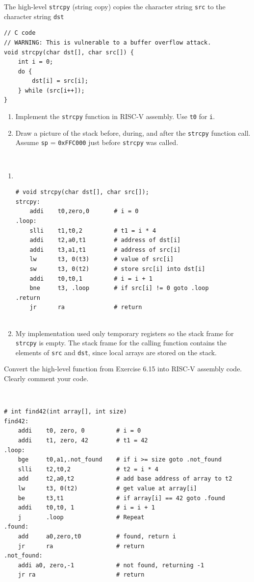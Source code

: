 \documentclass[12pt]{article}
\newenvironment{ex}[2][Exercise]{\begin{trivlist}
		\item[\hskip \labelsep {\bfseries #1}\hskip \labelsep {\bfseries #2.}]}{\end{trivlist}}
\newenvironment{sol}[1][Solution]{\begin{trivlist}
		\item[\hskip \labelsep {\bfseries #1:}]}{\end{trivlist}}
\begin{document}
\begin{ex}{6.16}
	The high-level \texttt{strcpy}  (string copy) copies the character
	string \texttt{src} to the character string \texttt{dst}
	\begin{lstlisting}
// C code
// WARNING: This is vulnerable to a buffer overflow attack.
void strcpy(char dst[], char src[]) {
	int i = 0;
	do {
		dst[i] = src[i];
	} while (src[i++]);
}
	\end{lstlisting}
	\begin{enumerate}[label=(\alph*)]
		\item Implement the \texttt{strcpy} function in RISC-V assembly.
		Use \texttt{t0} for \texttt{i}.
		\item Draw a picture of the stack before, during, and after the
		\texttt{strcpy} function call. Assume \texttt{sp} = \texttt{0xFFC000}
		just before \texttt{strcpy} was called.
	\end{enumerate}
\end{ex}

\begin{sol}
	\
	\begin{enumerate}[label=(\alph*)]
		\item 
		\
		\begin{lstlisting}[language={}]
	# void strcpy(char dst[], char src[]);
strcpy:
	addi	t0,zero,0		# i = 0
.loop:
	slli	t1,t0,2			# t1 = i * 4
	addi	t2,a0,t1		# address of dst[i]
	addi	t3,a1,t1		# address of src[i]
	lw		t3, 0(t3)		# value of src[i]
	sw		t3, 0(t2)		# store src[i] into dst[i]
	addi	t0,t0,1			# i = i + 1
	bne		t3, .loop		# if src[i] != 0 goto .loop
.return
	jr		ra				# return
	
		\end{lstlisting}
	\item My implementation used only temporary registers so the stack
	frame for \texttt{strcpy} is empty. The stack frame for the calling
	function contains the elements of \texttt{src} and \texttt{dst},
	since local arrays are stored on the stack.
	\end{enumerate}
\end{sol}

\begin{ex}{6.17}
	Convert the high-level function from Exercise 6.15 into RISC-V assembly
	code. Clearly comment your code.
\end{ex}

\begin{sol}
	\
	\begin{lstlisting}[language={}]
	# int find42(int array[], int size)
find42:
	addi	t0, zero, 0			# i = 0
	addi	t1, zero, 42		# t1 = 42
.loop:
	bge		t0,a1,.not_found	# if i >= size goto .not_found
	slli	t2,t0,2				# t2 = i * 4
	add		t2,a0,t2			# add base address of array to t2
	lw		t3, 0(t2)			# get value at array[i]
	be		t3,t1				# if array[i] == 42 goto .found
	addi	t0,t0, 1			# i = i + 1
	j		.loop				# Repeat
.found:
	add		a0,zero,t0			# found, return i
	jr		ra					# return
.not_found:
	addi a0, zero,-1			# not found, returning -1
	jr ra						# return
	\end{lstlisting}
\end{sol}
\end{document}
